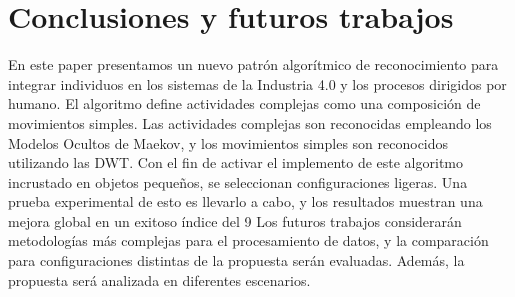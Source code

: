 \documentclass{article}
\begin{document}
\section {Conclusiones y futuros trabajos}
En este paper presentamos un nuevo patrón algorítmico de reconocimiento para integrar individuos en los sistemas de la Industria 4.0 y los procesos dirigidos por humano. El algoritmo define actividades complejas como una composición de movimientos simples. Las actividades complejas son reconocidas empleando los Modelos Ocultos de Maekov, y los movimientos simples son reconocidos utilizando las DWT. Con el fin de activar el implemento de este algoritmo incrustado en objetos pequeños, se seleccionan configuraciones ligeras. Una prueba experimental de esto es llevarlo a cabo, y los resultados muestran una mejora global en un exitoso índice del 9%
Los futuros trabajos considerarán metodologías más complejas para el procesamiento de datos, y la comparación para configuraciones distintas de la propuesta serán evaluadas.
Además, la propuesta será analizada en diferentes escenarios. 
\end{document}
